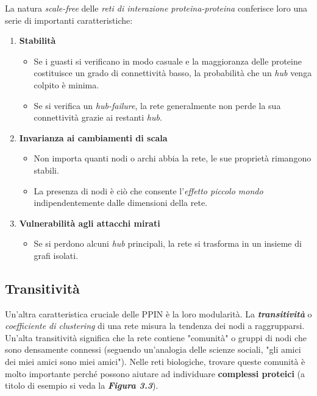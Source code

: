 \documentclass[11pt]{article}
\begin{document}
La natura \textit{scale-free} delle \textit{reti di interazione proteina-proteina} conferisce loro una serie di importanti caratteristiche:
\begin{enumerate}
\setlength{\itemsep}{1pt}
  \setlength{\parskip}{0pt}
  \setlength{\parsep}{0pt}
\item \textbf{Stabilità}
\begin{itemize}
\setlength{\itemsep}{1pt}
  \setlength{\parskip}{0pt}
  \setlength{\parsep}{0pt}
\item Se i guasti si verificano in modo casuale e la maggioranza delle proteine costituisce un grado di connettività basso, la probabilità che un \textit{hub} venga colpito è minima.
\item Se si verifica un \textit{hub-failure}, la rete generalmente non perde la sua connettività grazie ai restanti \textit{hub}.
\end{itemize}

\item \textbf{Invarianza ai cambiamenti di scala}
\begin{itemize}
\item Non importa quanti nodi o archi abbia la rete, le sue proprietà rimangono stabili.
\item La presenza di nodi è ciò che consente l'\textit{effetto piccolo mondo} indipendentemente dalle dimensioni della rete.
\end{itemize}

\item \textbf{Vulnerabilità agli attacchi mirati}
\begin{itemize}
\item Se si perdono alcuni \textit{hub} principali, la rete si trasforma in un insieme di grafi isolati.
\end{itemize}
\end{enumerate}

\subsection{Transitività}
Un'altra caratteristica cruciale delle PPIN è la loro modularità. La \textit{\textbf{transitività}} o \textit{coefficiente di clustering} di una rete misura la tendenza dei nodi a raggrupparsi. Un'alta transitività significa che la rete contiene "comunità" o gruppi di nodi che sono densamente connessi (seguendo un'analogia delle scienze sociali, "gli amici dei miei amici sono miei amici"). Nelle reti biologiche, trovare queste comunità è molto importante perché possono aiutare ad individuare  \textbf{complessi proteici} (a titolo di esempio si veda la \textit{\textbf{Figura 3.3}}).
\end{document}
